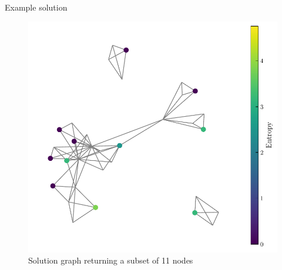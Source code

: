 \documentclass[handout]{beamer}
\begin{document}
\begin{frame}{Example solution}
    \begin{figure}
        \includegraphics[width=.6\textwidth]{../Figures/solutionGraph_pad.pdf}
        \caption{Solution graph returning a subset of 11 nodes}
    \end{figure}

\end{frame}
\end{document}
